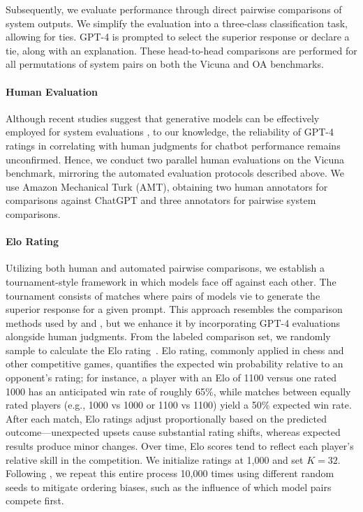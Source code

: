 Subsequently, we evaluate performance through direct pairwise comparisons of system outputs. We simplify the evaluation into a three-class classification task, allowing for ties. GPT-4 is prompted to select the superior response or declare a tie, along with an explanation. These head-to-head comparisons are performed for all permutations of system pairs on both the Vicuna and OA benchmarks.

\paragraph{Human Evaluation} Although recent studies suggest that generative models can be effectively employed for system evaluations \citep{fu2023gptscore}, to our knowledge, the reliability of GPT-4 ratings in correlating with human judgments for chatbot performance remains unconfirmed. Hence, we conduct two parallel human evaluations on the Vicuna benchmark, mirroring the automated evaluation protocols described above. We use Amazon Mechanical Turk (AMT), obtaining two human annotators for comparisons against ChatGPT and three annotators for pairwise system comparisons.

\paragraph{Elo Rating} Utilizing both human and automated pairwise comparisons, we establish a tournament-style framework in which models face off against each other. The tournament consists of matches where pairs of models vie to generate the superior response for a given prompt. This approach resembles the comparison methods used by \citet{bai2022training} and \citet{vicuna2023}, but we enhance it by incorporating GPT-4 evaluations alongside human judgments. From the labeled comparison set, we randomly sample to calculate the Elo rating~\citep{elo1967proposed,elo1978rating}. Elo rating, commonly applied in chess and other competitive games, quantifies the expected win probability relative to an opponent's rating; for instance, a player with an Elo of 1100 versus one rated 1000 has an anticipated win rate of roughly 65\%, while matches between equally rated players (e.g., 1000 vs 1000 or 1100 vs 1100) yield a 50\% expected win rate. After each match, Elo ratings adjust proportionally based on the predicted outcome—unexpected upsets cause substantial rating shifts, whereas expected results produce minor changes. Over time, Elo scores tend to reflect each player's relative skill in the competition. We initialize ratings at 1,000 and set $K=32$. Following \citet{vicuna2023}, we repeat this entire process 10,000 times using different random seeds to mitigate ordering biases, such as the influence of which model pairs compete first.

